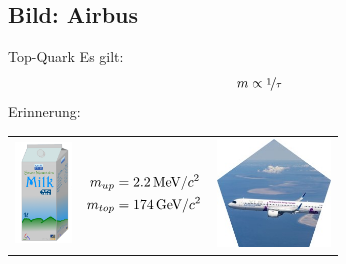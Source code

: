 \subsection{Bild: Airbus}
\begin{frame}{Top-Quark}
Es gilt:
    \[ m \propto \nicefrac{1}{\tau} \] \pause
     Erinnerung:

    \begin{table}[]
    \centering
    \begin{tabular}{ccc}
       \includegraphics[width=1.5cm]{Figures Lecture on Hadrons/SevenMountainsMilk.png}  &\parbox{4cm}{\vspace{-3cm}\begin{align*}m_{up}&= 2.2\,\textmd{MeV}/c^2 \\m_{top}&=174\,\textmd{GeV}/c^2 \end{align*}} & \includegraphics[width=3cm]{Figures Lecture on Hadrons/Airbus A321Neo.jpg}
       \end{tabular}  
\end{table} \pause

\begin{center}
     \\
   \end{center}
    \end{frame}
